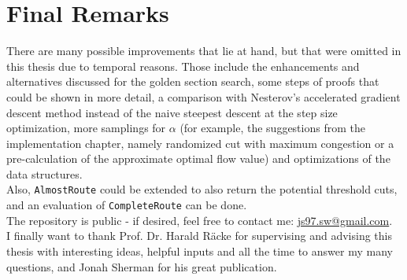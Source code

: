 \chapter{Final Remarks}
There are many possible improvements that lie at hand, but that were omitted in this thesis due to temporal reasons. Those include the enhancements and alternatives discussed for the golden section search, some steps of proofs that could be shown in more detail, a comparison with Nesterov's accelerated gradient descent method instead of the naive steepest descent at the step size optimization, more samplings for $\alpha$ (for example, the suggestions from the implementation chapter, namely randomized cut with maximum congestion or a pre-calculation of the approximate optimal flow value) and optimizations of the data structures.\\
Also, \texttt{AlmostRoute} could be extended to also return the potential threshold cuts, and an evaluation of \texttt{CompleteRoute} can be done.\\
The repository is public - if desired, feel free to contact me: \url{js97.sw@gmail.com}.\\
I finally want to thank Prof. Dr. Harald Räcke for supervising and advising this thesis with interesting ideas, helpful inputs and all the time to answer my many questions, and Jonah Sherman for his great publication.

%
\listoffigures %
\printglossary[type=\acronymtype,title=Abkürzungsverzeichnis] %


\onehalfspacing



\printbibliography


